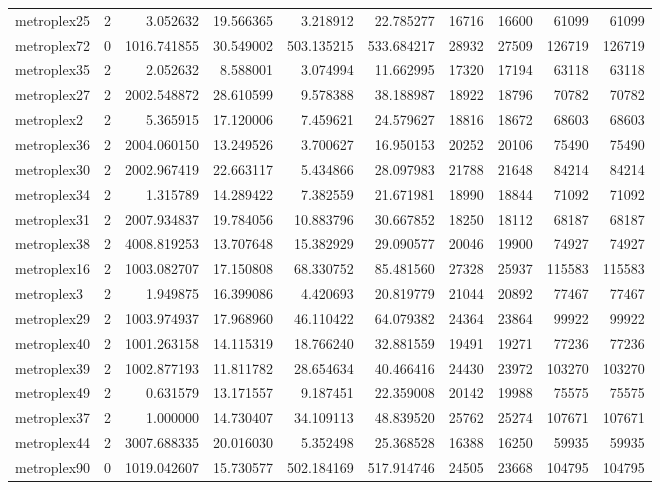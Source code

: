 \begin{longtable}{|l|r|r|r|r|r|r|r|r|r|}
metroplex25 & 2 & 3.052632 & 19.566365 & 3.218912 & 22.785277 & 16716 & 16600 & 61099 & 61099 \\
metroplex72 & 0 & 1016.741855 & 30.549002 & 503.135215 & 533.684217 & 28932 & 27509 & 126719 & 126719 \\
metroplex35 & 2 & 2.052632 & 8.588001 & 3.074994 & 11.662995 & 17320 & 17194 & 63118 & 63118 \\
metroplex27 & 2 & 2002.548872 & 28.610599 & 9.578388 & 38.188987 & 18922 & 18796 & 70782 & 70782 \\
metroplex2 & 2 & 5.365915 & 17.120006 & 7.459621 & 24.579627 & 18816 & 18672 & 68603 & 68603 \\
metroplex36 & 2 & 2004.060150 & 13.249526 & 3.700627 & 16.950153 & 20252 & 20106 & 75490 & 75490 \\
metroplex30 & 2 & 2002.967419 & 22.663117 & 5.434866 & 28.097983 & 21788 & 21648 & 84214 & 84214 \\
metroplex34 & 2 & 1.315789 & 14.289422 & 7.382559 & 21.671981 & 18990 & 18844 & 71092 & 71092 \\
metroplex31 & 2 & 2007.934837 & 19.784056 & 10.883796 & 30.667852 & 18250 & 18112 & 68187 & 68187 \\
metroplex38 & 2 & 4008.819253 & 13.707648 & 15.382929 & 29.090577 & 20046 & 19900 & 74927 & 74927 \\
metroplex16 & 2 & 1003.082707 & 17.150808 & 68.330752 & 85.481560 & 27328 & 25937 & 115583 & 115583 \\
metroplex3 & 2 & 1.949875 & 16.399086 & 4.420693 & 20.819779 & 21044 & 20892 & 77467 & 77467 \\
metroplex29 & 2 & 1003.974937 & 17.968960 & 46.110422 & 64.079382 & 24364 & 23864 & 99922 & 99922 \\
metroplex40 & 2 & 1001.263158 & 14.115319 & 18.766240 & 32.881559 & 19491 & 19271 & 77236 & 77236 \\
metroplex39 & 2 & 1002.877193 & 11.811782 & 28.654634 & 40.466416 & 24430 & 23972 & 103270 & 103270 \\
metroplex49 & 2 & 0.631579 & 13.171557 & 9.187451 & 22.359008 & 20142 & 19988 & 75575 & 75575 \\
metroplex37 & 2 & 1.000000 & 14.730407 & 34.109113 & 48.839520 & 25762 & 25274 & 107671 & 107671 \\
metroplex44 & 2 & 3007.688335 & 20.016030 & 5.352498 & 25.368528 & 16388 & 16250 & 59935 & 59935 \\
metroplex90 & 0 & 1019.042607 & 15.730577 & 502.184169 & 517.914746 & 24505 & 23668 & 104795 & 104795 \\

\end{longtable}
